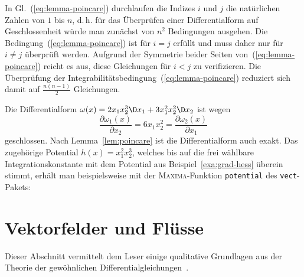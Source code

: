 In Gl.~(\ref{eq:lemma-poincare}) durchlaufen die Indizes $i$ und
$j$ die natürlichen Zahlen von $1$ bis $n$, d.\,h. für das Überprüfen
einer Differentialform auf Geschlossenheit würde man zunächst von
$n^{2}$ Bedingungen ausgehen. Die Bedingung~(\ref{eq:lemma-poincare})
ist für $i=j$ erfüllt und muss daher nur für $i\neq j$ überprüft
werden. Aufgrund der Symmetrie beider Seiten von~(\ref{eq:lemma-poincare})
reicht es aus, diese Gleichungen für $i<j$ zu verifizieren. Die Überprüfung
der Integrabilitätsbedingung~(\ref{eq:lemma-poincare}) reduziert
sich damit auf $\frac{n(n-1)}{2}$ Gleichungen.
\begin{example}
\label{exa:Integration-Differentialform-Poincare}Die Differentialform
$\omega(x)=2x_{1}x_{2}^{3}\D x_{1}+3x_{1}^{2}x_{2}^{2}\D x_{2}$ ist
wegen
\[
\frac{\partial\omega_{1}(x)}{\partial x_{2}}=6x_{1}x_{2}^{2}=\frac{\partial\omega_{2}(x)}{\partial x_{1}}
\]
geschlossen. Nach Lemma~\ref{lem:poincare} ist die Differentialform
auch exakt. Das zugehörige Potential
$h(x)=x_{1}^{2}x_{2}^{3}$, welches bis auf die frei wählbare Integrationskonstante
mit dem Potential aus Beispiel~\ref{exa:grad-hess}
überein stimmt, erhält man beispielsweise mit der \textsc{Maxima}-Funktion
\texttt{potential} des \texttt{vect}-Pakets:


\end{example}

\section{Vektorfelder und Flüsse\label{sec:Vektorfelder-und-Fluesse}}

Dieser Abschnitt vermittelt dem Leser einige qualitative Grundlagen
aus der Theorie der gewöhnlichen Differentialgleichungen~\cite{arnold2001}.

